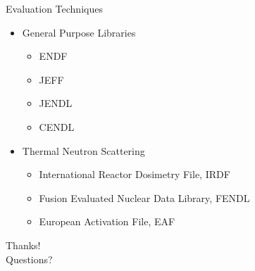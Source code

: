 \documentclass[sans,mathserif,aspectratio=169, 10pt]{beamer}
\begin{document}
\begin{frame}{Evaluation Techniques}
\begin{itemize}
  \item<1> General Purpose Libraries
	\begin{itemize}
		\item ENDF
		\item JEFF
		\item JENDL
		\item CENDL
	\end{itemize}
	\item<2> Thermal Neutron Scattering
	\begin{itemize}
	 	\item International Reactor Dosimetry File, IRDF
		\item Fusion Evaluated Nuclear Data Library, FENDL
		\item European Activation File, EAF
	\end{itemize}
\end{itemize}
\end{frame}


\begin{frame}
\centering
\Huge
Thanks! \\
Questions?
\end{frame}
\end{document}
